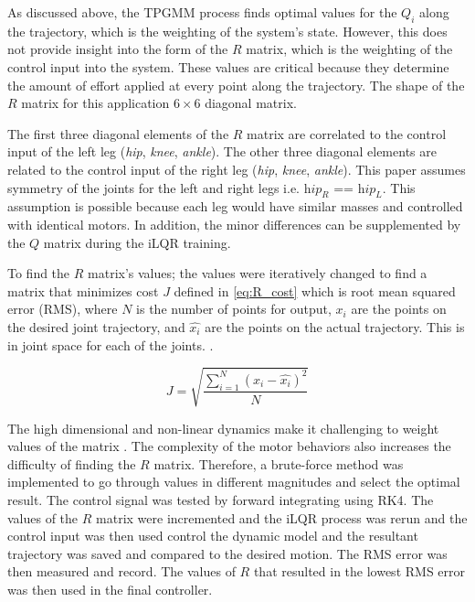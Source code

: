 As discussed above, the TPGMM process finds optimal values for the $Q_i$ along the trajectory, which is the weighting of the system's state. However, this does not provide insight into the form of the $R$ matrix, which is the weighting of the control input into the system. These values are critical because they determine the amount of effort applied at every point along the trajectory. The shape of the $R$ matrix for this application  $6 \times 6$ diagonal matrix.


The first three diagonal elements of the $R$ matrix are correlated to the control input of the left leg (\textit{hip}, \textit{knee}, \textit{ankle}). The other three diagonal elements are related to the control input of the right leg (\textit{hip}, \textit{knee}, \textit{ankle}). This paper assumes symmetry of the joints for the left and right legs i.e. $\textit{hip}_R$ == $\textit{hip}_L$.  This assumption is possible because each leg would have similar masses and controlled with identical motors. In addition, the minor differences can be supplemented by the $Q$ matrix during the iLQR training.  

To find the $R$ matrix's values; the values were iteratively changed to find a matrix that minimizes cost $J$ defined in \autoref{eq:R_cost} which is root mean squared error (RMS), where $N$ is the number of points for output, $x_i$ are the points on the desired joint trajectory, and $\hat{x_i}$ are the points on the actual trajectory. This is in joint space for each of the joints. 
 \cite{chai2014root}.

\begin{equation}
    J = \sqrt{\frac{\sum_{i=1}^N(x_i-\hat{x_i})^2}{N}}
    \label{eq:R_cost}
\end{equation}

The high dimensional and non-linear dynamics make it challenging to weight values of the matrix \cite{park2012multi}. The complexity of the motor behaviors also increases the difficulty of finding the $R$ matrix. Therefore, a brute-force method was implemented to go through values in different magnitudes and select the optimal result. The control signal was tested by forward integrating using RK4. The values of the $R$ matrix were incremented and the iLQR process was rerun and the control input was then used control the dynamic model and the resultant trajectory was saved and compared to the desired motion. The RMS error was then measured and record. The values of $R$ that resulted in the lowest RMS error was then used in the final controller. 

